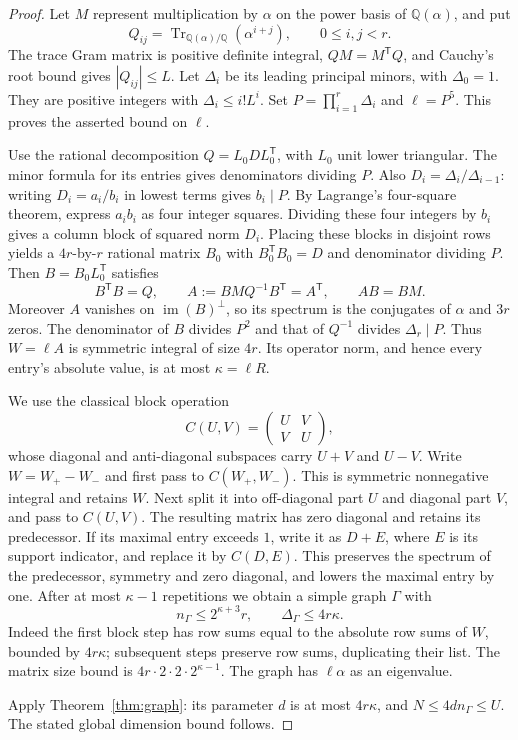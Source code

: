 \documentclass[11pt]{amsart}
\theoremstyle{remark}
\newcommand{\Q}{\mathbb Q}
\begin{document}
\begin{proof}
Let $M$ represent multiplication by $\alpha$ on the power basis of
$\Q(\alpha)$, and put
\[
 Q_{ij}=\operatorname{Tr}_{\Q(\alpha)/\Q}(\alpha^{i+j}),
 \qquad 0\le i,j<r.
\]
The trace Gram matrix is positive definite integral, $QM=M^{\mathsf T}Q$,
and Cauchy's root bound gives $|Q_{ij}|\le L$.
Let $\Delta_i$ be its leading principal minors, with $\Delta_0=1$.
They are positive integers with $\Delta_i\le i!L^i$.
Set $P=\prod_{i=1}^r\Delta_i$ and $\ell=P^5$.
This proves the asserted bound on $\ell$.

Use the rational decomposition $Q=L_0DL_0^{\mathsf T}$, with $L_0$
unit lower triangular. The minor formula for its entries gives
denominators dividing $P$. Also $D_i=\Delta_i/\Delta_{i-1}$:
writing $D_i=a_i/b_i$ in lowest terms gives $b_i\mid P$.
By Lagrange's four-square theorem, express $a_ib_i$ as four integer
squares. Dividing these four integers by $b_i$ gives a column block
of squared norm $D_i$. Placing these blocks in disjoint rows yields
a $4r$-by-$r$ rational matrix $B_0$ with
$B_0^{\mathsf T}B_0=D$ and denominator dividing $P$.
Then $B=B_0L_0^{\mathsf T}$ satisfies
\[
 B^{\mathsf T}B=Q,\qquad
 A:=BMQ^{-1}B^{\mathsf T}=A^{\mathsf T},\qquad AB=BM.
\]
Moreover $A$ vanishes on $\operatorname{im}(B)^\perp$, so its spectrum
is the conjugates of $\alpha$ and $3r$ zeros. The denominator of $B$
divides $P^2$ and that of $Q^{-1}$ divides $\Delta_r\mid P$.
Thus $W=\ell A$ is symmetric integral of size $4r$.
Its operator norm, and hence every entry's absolute value, is at most
$\kappa=\ell R$.

We use the classical block operation \cite[Lemma 2.4]{Godsil}
\[
 C(U,V)=\begin{pmatrix}U&V\\ V&U\end{pmatrix},
\]
whose diagonal and anti-diagonal subspaces carry $U+V$ and $U-V$.
Write $W=W_+-W_-$ and first pass to $C(W_+,W_-)$.
This is symmetric nonnegative integral and retains $W$.
Next split it into off-diagonal part $U$ and diagonal part $V$,
and pass to $C(U,V)$. The resulting matrix has zero diagonal and
retains its predecessor. If its maximal entry exceeds $1$, write it
as $D+E$, where $E$ is its support indicator, and replace it by
$C(D,E)$. This preserves the spectrum of the predecessor, symmetry
and zero diagonal, and lowers the maximal entry by one.
After at most $\kappa-1$ repetitions we obtain a simple graph $\Gamma$
with
\[
 n_\Gamma\le2^{\kappa+3}r,\qquad
 \Delta_\Gamma\le4r\kappa.
\]
Indeed the first block step has row sums equal to the absolute row
sums of $W$, bounded by $4r\kappa$; subsequent steps preserve row sums,
duplicating their list. The matrix size bound is
$4r\cdot2\cdot2\cdot2^{\kappa-1}$.
The graph has $\ell\alpha$ as an eigenvalue.

Apply Theorem~\ref{thm:graph}: its parameter $d$ is at most $4r\kappa$,
and $N\le4dn_\Gamma\le U$. The stated global dimension bound follows.
\end{proof}
\end{document}
